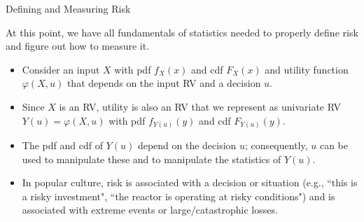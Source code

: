 \documentclass[9pt]{beamer}
\begin{document}
%
\begin{frame}{Defining and Measuring Risk}

At this point, we have all fundamentals of statistics needed to properly define risk and figure out how to measure it.

\begin{itemize}

\item Consider an input $X$ with pdf $f_X(x)$ and cdf $F_X(x)$ and utility function $\varphi(X,u)$ that depends on the input RV and a decision $u$. 

\item Since $X$ is an RV, utility is also an RV that we represent as univariate RV $Y(u)=\varphi(X,u)$ with pdf $f_{Y(u)}(y)$ and cdf $F_{Y(u)}(y)$. 

\item The pdf and cdf of $Y(u)$ depend on the decision $u$; consequently, $u$ can be used to manipulate these and to manipulate the statistics of $Y(u)$. 

\item In popular culture, risk is associated with a decision or situation (e.g., ``this is a risky investment", ``the reactor is operating at risky conditions") and is associated with extreme events or large/catastrophic losses.    

\end{itemize}

\end{frame}
\end{document}
